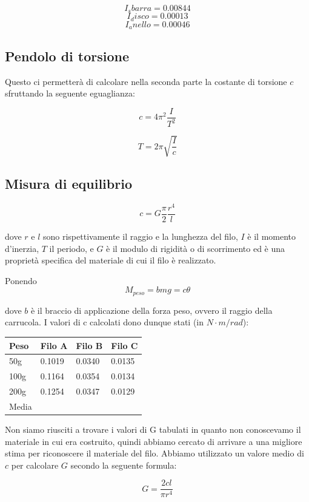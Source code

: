 \documentclass[a4paper,10pt]{report}
\begin{document}
$$ I_sbarra = 0.00844 $$
$$ I_disco = 0.00013 $$
$$ I_anello = 0.00046 $$

\subsection{Pendolo di torsione}


Questo ci permetterà di calcolare nella seconda parte la costante di torsione $c$ sfruttando la seguente eguaglianza:

$$ c = 4\pi^2\frac{I}{T^2} $$


$$ T = 2\pi \sqrt{\frac{I}{c}}$$




\subsection{Misura di equilibrio}

$$ c = G \frac{\pi}{2}\frac{r^4}{l} $$

dove $r$ e $l$ sono rispettivamente il raggio e la lunghezza del filo, $I$ è il momento d'inerzia, $T$ il periodo, e $G$ è il modulo di rigidità o di scorrimento ed è una proprietà specifica del materiale di cui il filo è realizzato.

Ponendo
$$ M_{peso} = bmg = c\theta $$

dove $b$ è il braccio di applicazione della forza peso, ovvero il raggio della carrucola.
I valori di c calcolati dono dunque stati (in $N\cdot m/rad$):
\\
\begin{center}
\begin{tabular}{l|lll}
Peso & Filo A & Filo B & Filo C \\
\midrule
50g & 0.1019 & 0.0340 & 0.0135 \\
100g & 0.1164 & 0.0354 & 0.0134 \\
200g & 0.1254 & 0.0347 & 0.0129 \\
\midrule
Media & & & \\
\end{tabular}
\end{center}

Non siamo riusciti a trovare i valori di G tabulati in quanto non conoscevamo il materiale in cui era costruito, quindi abbiamo cercato di arrivare a una migliore stima per riconoscere il materiale del filo. Abbiamo utilizzato un valore medio di $c$ per calcolare $G$ secondo la seguente formula:

$$ G = \frac{2cl}{\pi r^4} $$
\end{document}
